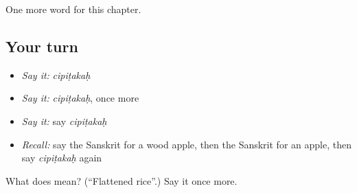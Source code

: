 \begin{grammarlens}[title={What you've built}]
One more word for this chapter.
\end{grammarlens}

\subsection*{Your turn}
\begin{itemize}
\raggedright
  \item \emph{Say it:} \emph{cipiṭakaḥ}
  \item \emph{Say it:} \emph{cipiṭakaḥ}, once more
  \item \emph{Say it:} say \emph{cipiṭakaḥ}
  \item \emph{Recall:} say the Sanskrit for a wood apple, then the Sanskrit for an apple, then say \emph{cipiṭakaḥ} again
\end{itemize}

\begin{tcolorbox}[breakable,colback=teal!4,colframe=teal!35!black,title={Before you move on}]
What does  mean? (\textquotedblleft{}Flattened rice\textquotedblright{}.) Say it once more.
\end{tcolorbox}
